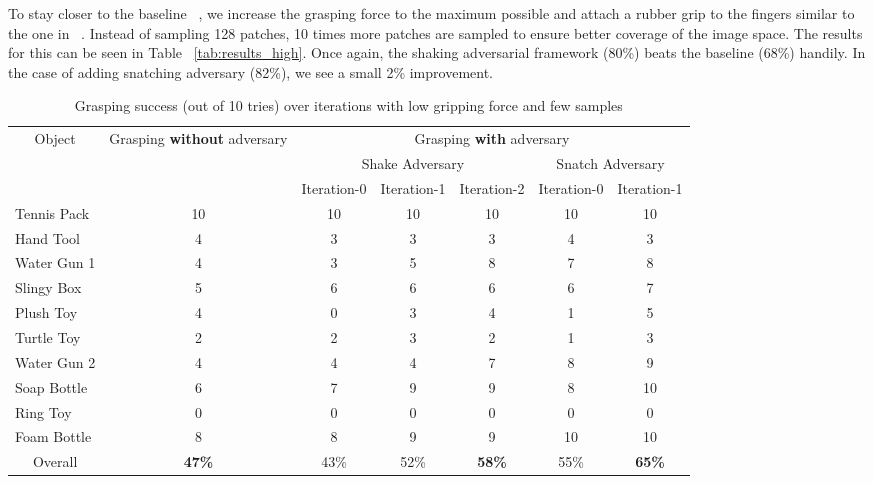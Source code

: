 \documentclass[letterpaper, 10 pt, conference]{ieeeconf}  %
\begin{document}
To stay closer to the baseline ~\cite{pinto2016supersizing}, we increase the grasping force to the maximum possible and attach a rubber grip to the fingers similar to the one in ~\cite{pinto2016supersizing}. Instead of sampling 128 patches, 10 times more patches are sampled to ensure better coverage of the image space. The results for this can be seen in Table ~\ref{tab:results_high}. Once again, the shaking adversarial framework (80\%) beats the baseline (68\%) handily. In the case of adding snatching adversary (82\%), we see a small 2\% improvement.

\begin{table*}[]
\centering
\caption{Grasping success (out of 10 tries) over iterations with low gripping force and few samples}
\label{tab:results_low}
\begin{tabular}{l|c|ccc|cc|}
\multicolumn{1}{c|}{\multirow{3}{*}{Object}} & \multicolumn{1}{c|}{\multirow{3}{*}{Grasping \textbf{without} adversary}} & \multicolumn{5}{c|}{Grasping \textbf{with} adversary} \\ \cline{3-7} 
\multicolumn{1}{c|}{} & \multicolumn{1}{c|}{} & \multicolumn{3}{c|}{Shake Adversary} & \multicolumn{2}{c|}{Snatch Adversary} \\ \cline{3-7} 
\multicolumn{1}{c|}{} & \multicolumn{1}{c|}{} & \multicolumn{1}{c}{Iteration-0} & \multicolumn{1}{c}{Iteration-1} & \multicolumn{1}{c|}{Iteration-2} & \multicolumn{1}{c}{Iteration-0} & \multicolumn{1}{c|}{Iteration-1} \\ \hline
Tennis Pack & 10 & 10 & 10 & 10 & 10 & 10 \\
Hand Tool & 4 & 3 & 3 & 3 & 4 & 3 \\
Water Gun 1 & 4 & 3 & 5 & 8 & 7 & 8 \\
Slingy Box & 5 & 6 & 6 & 6 & 6 & 7 \\
Plush Toy & 4 & 0 & 3 & 4 & 1 & 5 \\
Turtle Toy & 2 & 2 & 3 & 2 & 1 & 3 \\
Water Gun 2 & 4 & 4 & 4 & 7 & 8 & 9 \\
Soap Bottle & 6 & 7 & 9 & 9 & 8 & 10 \\
Ring Toy & 0 & 0 & 0 & 0 & 0 & 0 \\
Foam Bottle & 8 & 8 & 9 & 9 & 10 & 10 \\ \hline
\multicolumn{1}{c|}{Overall} & \textbf{47\%} & 43\% & 52\% & \textbf{58\%} & 55\% & \textbf{65\%}
\end{tabular}
\end{table*}\begin{table}[]

\end{table}
\end{document}
